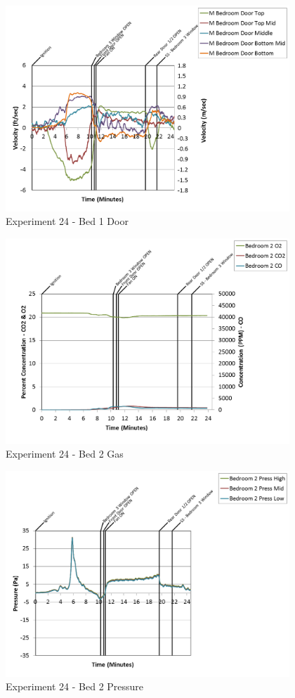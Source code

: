 \documentclass{article}
\begin{document}
\begin{appendices}
\clearpage

\begin{figure}[h!]
	\centering
	\includegraphics[height=3.05in]{0_Images/Results_Charts/Exp_24_Charts/Bed1Door.png}
	\caption{Experiment 24 - Bed 1 Door}
\end{figure}


\begin{figure}[h!]
	\centering
	\includegraphics[height=3.05in]{0_Images/Results_Charts/Exp_24_Charts/Bed2Gas.png}
	\caption{Experiment 24 - Bed 2 Gas}
\end{figure}

\clearpage

\begin{figure}[h!]
	\centering
	\includegraphics[height=3.05in]{0_Images/Results_Charts/Exp_24_Charts/Bed2Pressure.png}
	\caption{Experiment 24 - Bed 2 Pressure}
\end{figure}



\end{appendices}
\end{document}
